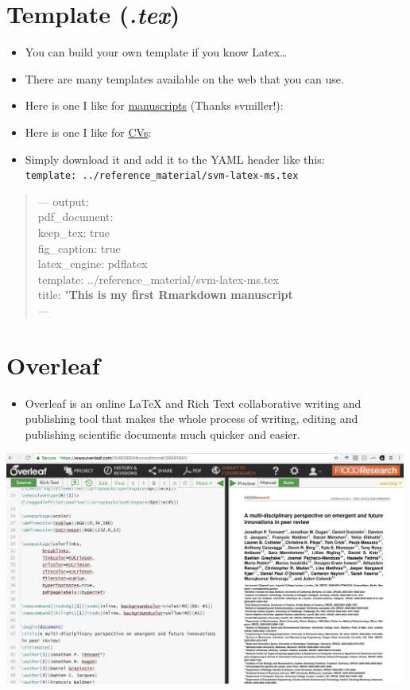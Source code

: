 \documentclass[]{article}
\providecommand{\tightlist}{%
  \setlength{\itemsep}{0pt}\setlength{\parskip}{0pt}}
\begin{document}
\hypertarget{template-.tex}{%
\section{\texorpdfstring{Template
(\emph{.tex})}{Template (.tex)}}\label{template-.tex}}

\begin{itemize}
\item
  You can build your own template if you know Latex\ldots{}
\item
  There are many templates available on the web that you can use.
\item
  Here is one I like for
  \href{https://github.com/svmiller/svm-r-markdown-templates/blob/master/svm-latex-ms.tex}{manuscripts}
  (Thanks svmiller!):
\item
  Here is one I like for
  \href{https://github.com/svmiller/svm-r-markdown-templates/blob/master/svm-latex-cv.tex}{CVs}:
\item
  Simply download it and add it to the YAML header like this:
  \texttt{template:\ ../reference\_material/svm-latex-ms.tex}
\end{itemize}

\begin{quote}
--- output:\\
pdf\_document:\\
keep\_tex: true\\
fig\_caption: true\\
latex\_engine: pdflatex\\
template: ../reference\_material/svm-latex-ms.tex\\
title: "\textbf{This is my first Rmarkdown manuscript}\\
---
\end{quote}

\hypertarget{overleaf}{%
\section{Overleaf}\label{overleaf}}

\begin{itemize}
\tightlist
\item
  Overleaf is an online LaTeX and Rich Text collaborative writing and
  publishing tool that makes the whole process of writing, editing and
  publishing scientific documents much quicker and easier.
\end{itemize}

\includegraphics[width=5.20833in,height=\textheight]{../figures/overleaf.png}
\end{document}
